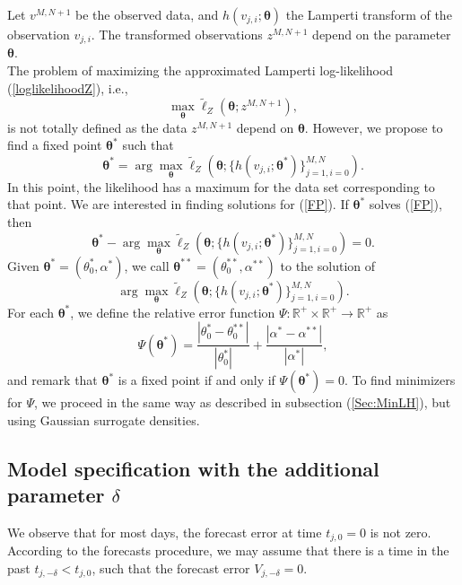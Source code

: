 \documentclass[11pt]{article}
\theoremstyle{definition}
\newcommand{\R}{\mathbb{R}}
\begin{document}
Let $v^{M,N+1}$ be the observed data, and $h( v_{j,i};\bm{\theta})$ the Lamperti transform of the observation $v_{j,i}$. The transformed observations $z^{M,N+1}$ depend on the parameter $\bm{\theta}$.\\
The problem of maximizing the approximated Lamperti log-likelihood (\ref{loglikelihoodZ}), i.e.,  $$\max_{\bm{\theta}}\tilde{\ell}_Z\left(\bm{\theta}; z^{M,N+1}\right),$$
is not totally defined as the data $z^{M,N+1}$ depend on $\bm{\theta}$. However, we propose to find a fixed point $\bm{\theta}^*$ such that
\begin{equation}
\bm{\theta}^*=\arg\max_{\bm{\theta}}\tilde{\ell}_Z\left(\bm{\theta};\{h( v_{j,i};\bm{\theta}^*)\}_{j=1,i=0}^{M,N}\right).
\label{FP}
\end{equation}
{\color{red}In this point, the likelihood has a maximum for the data set corresponding to that point.}
We are interested in finding solutions for (\ref{FP}). If $\bm{\theta}^*$ solves (\ref{FP}), then
\begin{equation*}
\bm{\theta}^*-\arg\max_{\bm{\theta}}\tilde{\ell}_Z\left(\bm{\theta};\{h( v_{j,i};\bm{\theta}^*)\}_{j=1,i=0}^{M,N}\right)=0.
\end{equation*}
Given $\bm{\theta}^*=(\theta_0^*,\alpha^*)$, we call $\bm{\theta}^{**}=(\theta_0^{**},\alpha^{**})$ to the solution of
\begin{equation*}
\arg\max_{\bm{\theta}}\tilde{\ell}_Z\left(\bm{\theta};\{h( v_{j,i};\bm{\theta}^*)\}_{j=1,i=0}^{M,N}\right).
\end{equation*}
For each $\bm{\theta}^*$, we define the relative error function $\Psi:\R^+\times\R^+\to\R^+$ as
\begin{equation}
\Psi(\bm{\theta}^*)=\frac{|\theta_0^*-\theta_0^{**}|}{|\theta_0^*|}+\frac{|\alpha^*-\alpha^{**}|}{|\alpha^*|},
\label{eq:rel_error}
\end{equation}
and remark that $\bm{\theta}^*$ is a fixed point if and only if $\Psi(\bm{\theta}^*)=0$. To find minimizers for $\Psi$, we proceed in the same way as described in subsection (\ref{Sec:MinLH}), but using Gaussian surrogate densities.

\subsection{Model specification with the additional parameter $\delta$}

We observe that for most days, the forecast error at time $t_{j,0}=0$ is not zero. According to the forecasts procedure, we may assume that there is a time in the past $t_{j,-\delta}<t_{j,0}$, such that the forecast error $V_{j,-\delta}=0$.\\
\end{document}
